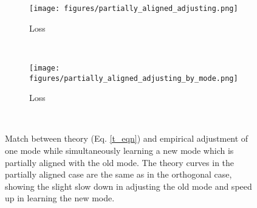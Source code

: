 \documentclass{article}
\begin{document}
\begin{figure}
\centering
\begin{subfigure}[b]{0.49\textwidth}
\texttt{[image: figures/partially\_aligned\_adjusting.png]}
\caption{Loss}
\end{subfigure}~%
\begin{subfigure}[b]{0.49\textwidth}
\texttt{[image: figures/partially\_aligned\_adjusting\_by\_mode.png]}
\caption{Loss}
\end{subfigure}~%
\caption{Match between theory (Eq. \ref{t_eqn}) and empirical adjustment of one mode while simultaneously learning a new mode which is partially aligned with the old mode. The theory curves in the partially aligned case are the same as in the orthogonal case, showing the slight slow down in adjusting the old mode and speed up in learning the new mode.}
\label{al_adj_fig}
\end{figure}
\end{document}
